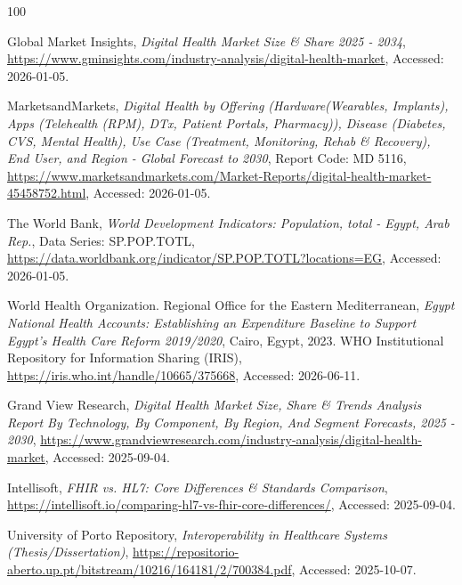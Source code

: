 \renewcommand{\bibname}{References}

\begin{thebibliography}{100}

  Global Market Insights,
  \textit{Digital Health Market Size \& Share 2025 - 2034},
  \url{https://www.gminsights.com/industry-analysis/digital-health-market}, Accessed: 2026-01-05.

  MarketsandMarkets,
  \textit{Digital Health by Offering (Hardware(Wearables, Implants), Apps (Telehealth (RPM), DTx, Patient Portals, Pharmacy)), Disease (Diabetes, CVS, Mental Health), Use Case (Treatment, Monitoring, Rehab \& Recovery), End User, and Region - Global Forecast to 2030},
  Report Code: MD 5116, \url{https://www.marketsandmarkets.com/Market-Reports/digital-health-market-45458752.html}, Accessed: 2026-01-05.

  The World Bank,
  \textit{World Development Indicators: Population, total - Egypt, Arab Rep.},
  Data Series: SP.POP.TOTL, \url{https://data.worldbank.org/indicator/SP.POP.TOTL?locations=EG}, Accessed: 2026-01-05.

  World Health Organization. Regional Office for the Eastern Mediterranean,
  \textit{Egypt National Health Accounts: Establishing an Expenditure Baseline to Support Egypt's Health Care Reform 2019/2020},
  Cairo, Egypt, 2023. WHO Institutional Repository for Information Sharing (IRIS), \url{https://iris.who.int/handle/10665/375668}, Accessed: 2026-06-11.

  
  Grand View Research,
  \textit{Digital Health Market Size, Share \& Trends Analysis Report By Technology, By Component, By Region, And Segment Forecasts, 2025 - 2030},
  \url{https://www.grandviewresearch.com/industry-analysis/digital-health-market}, Accessed: 2025-09-04.

  Intellisoft,
  \textit{FHIR vs. HL7: Core Differences \& Standards Comparison},
  \url{https://intellisoft.io/comparing-hl7-vs-fhir-core-differences/}, Accessed: 2025-09-04.

  University of Porto Repository,
  \textit{Interoperability in Healthcare Systems (Thesis/Dissertation)},
  \url{https://repositorio-aberto.up.pt/bitstream/10216/164181/2/700384.pdf}, Accessed: 2025-10-07.


\end{thebibliography}
